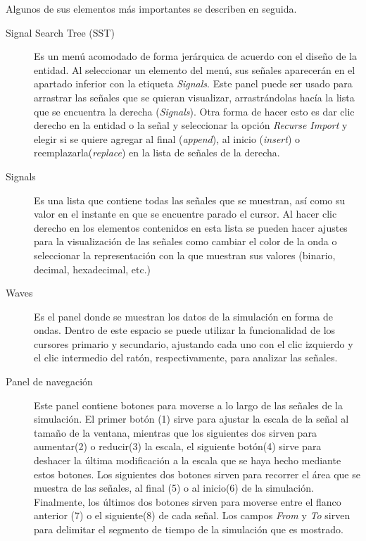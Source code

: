 \documentclass[11pt]{article}
\begin{document}
Algunos de sus elementos más importantes se describen en seguida.

\begin{description}

\item[Signal Search Tree (SST)] Es un menú acomodado de forma jerárquica de acuerdo
    con el diseño de la entidad. Al seleccionar un elemento del menú, sus señales
    aparecerán en el apartado inferior con la etiqueta \textit{Signals}. Este panel puede
    ser usado para arrastrar las señales que se quieran visualizar, arrastrándolas
    hacía la lista que se encuentra la derecha (\textit{Signals}). Otra forma de hacer esto
    es dar clic derecho en la entidad o la señal y seleccionar la opción \textit{Recurse
    Import} y elegir si se quiere agregar al final (\textit{append}), al
    inicio (\textit{insert}) o reemplazarla(\textit{replace}) en la lista de señales de la derecha.

\item[Signals] Es una lista que contiene todas las señales que se muestran, así como
    su valor en el instante en que se encuentre parado el cursor. Al hacer clic
    derecho en los elementos contenidos en esta lista se pueden hacer ajustes para
    la visualización de las señales como cambiar el color de la onda o seleccionar
    la representación con la que muestran sus valores (binario, decimal, hexadecimal, etc.)

\item[Waves] Es el panel donde se muestran los datos de la simulación en forma de
    ondas. Dentro de este espacio se puede utilizar la funcionalidad de los
    cursores primario y secundario, ajustando cada uno con el clic izquierdo y el
    clic intermedio del ratón, respectivamente, para analizar las señales.

\item[Panel de navegación] Este panel contiene botones para moverse a lo largo de las
    señales de la simulación. El primer botón (1) sirve para ajustar la escala de la
    señal al tamaño de la ventana, mientras que los siguientes dos sirven para
    aumentar(2) o reducir(3) la escala, el siguiente botón(4) sirve para deshacer la última
    modificación a la escala que se haya hecho mediante estos botones. Los
    siguientes dos botones sirven para recorrer el área que se muestra de las
    señales, al final (5) o al inicio(6) de la simulación. Finalmente, los últimos dos
    botones sirven para moverse entre el flanco anterior (7) o el siguiente(8) de cada
    señal. Los campos \textit{From} y \textit{To} sirven para delimitar el segmento de
    tiempo de la simulación que es mostrado.
\end{description}
\end{document}
